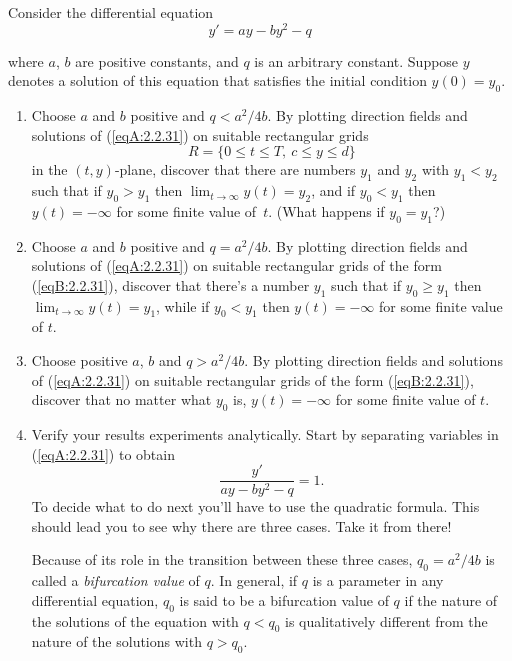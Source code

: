 \documentclass{ximera}
\begin{document}
\begin{problem}\label{exer:2.2.31}
Consider the differential equation
\begin{equation}\label{eqA:2.2.31}
    y'=ay-by^2-q
\end{equation}

where $a$, $b$ are positive constants, and $q$ is an arbitrary
constant. Suppose  $y$ denotes a solution of this equation
that satisfies the initial condition $y(0)=y_0$.

\begin{enumerate}
\item %
Choose  $a$ and $b$ positive and  $q<a^2/4b$.
By plotting  direction fields and solutions of (\ref{eqA:2.2.31}) on
suitable rectangular grids
\begin{equation}\label{eqB:2.2.31}
    R=\{0\leq t \leq T,\ c\leq y \leq d\}
\end{equation}
in the $(t,y)$-plane,  discover that there are numbers $y_1$ and
$y_2$ with $y_1<y_2$ such that if $y_0>y_1$ then
$\lim_{t\to\infty}y(t)=y_2$, and if $y_0<y_1$ then $y(t)=-\infty$
for some finite value of~$t$. (What happens if $y_0=y_1$?)

\item %
Choose $a$ and $b$ positive and $q=a^2/4b$. By plotting direction
fields
and solutions of (\ref{eqA:2.2.31}) on suitable rectangular grids of the form (\ref{eqB:2.2.31}),
discover that there's a number $y_1$ such that if $y_0\geq y_1$ then
$\lim_{t\to\infty}y(t)=y_1$, while if $y_0<y_1$ then  $y(t)=-\infty$
for some finite value of $t$.

\item %
Choose positive $a$, $b$ and $q>a^2/4b$. By plotting direction fields
and solutions of (\ref{eqA:2.2.31}) on suitable rectangular grids of the form (\ref{eqB:2.2.31}),
discover that
no matter what $y_0$ is, $y(t)=-\infty$ for some finite value of $t$.

\item %
Verify your results experiments analytically.
Start by separating variables in (\ref{eqA:2.2.31})  to obtain
$$
\frac{y'}{ay-by^2-q}=1.
$$
To decide what to do next you'll have to use the
quadratic formula. This should lead you to see why there are
three cases.  Take it from there!

Because of its role in the transition between these
three cases,  $q_0=a^2/4b$ is called a \emph{bifurcation value}
of $q$. In general, if $q$ is a parameter in any differential
equation,  $q_0$ is said to be a bifurcation value of
$q$ if the nature of the solutions of the equation with $q<q_0$
is qualitatively different from the nature of the solutions
with $q>q_0$.
\end{enumerate}
\end{problem}
\end{document}
